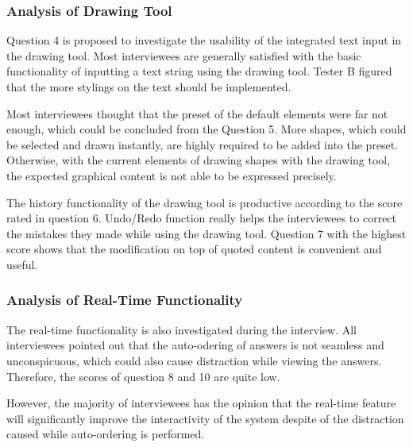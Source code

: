 \subsubsection{Analysis of Drawing Tool }
Question 4 is proposed to investigate the usability of the integrated text input in the drawing tool. Most interviewees are generally satisfied with the basic functionality of inputting a text string using the drawing tool. Tester B figured that the more stylings on the text should be implemented.

Most interviewees thought that the preset of the default elements were far not enough, which could be concluded from the Question 5. More shapes, which could be selected and drawn instantly, are highly required to be added into the preset. Otherwise, with the current elements of drawing shapes with the drawing tool, the expected graphical content is not able to be expressed precisely.

The history functionality of the drawing tool is productive according to the score rated in question 6. Undo/Redo function really helps the interviewees to correct the mistakes they made while using the drawing tool. Question 7 with the highest score shows that the modification on top of quoted content is convenient and useful.

\subsubsection{Analysis of Real-Time Functionality}

The real-time functionality is also investigated during the interview. All interviewees pointed out that the auto-odering of answers is not seamless and unconspicuous, which could also cause distraction while viewing the answers. Therefore, the scores of question 8 and 10 are quite low.

However, the majority of interviewees has the opinion that the real-time feature will significantly improve the interactivity of the system despite of the distraction caused while auto-ordering is performed.

